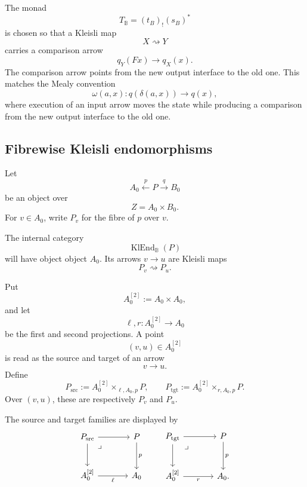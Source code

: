 \begin{remark}
\label{rem:to-direction-output-comparison}
    The monad
    \[
        T_{\mathbb B}=(t_B)_!(s_B)^*
    \]
    is chosen so that a Kleisli map
    \[
        X\rightsquigarrow Y
    \]
    carries a comparison arrow
    \[
        q_Y(Fx)\to q_X(x).
    \]
    The comparison arrow points from the new output interface to the old one.
    This matches the Mealy convention
    \[
        \omega(a,x):q(\delta(a,x))\to q(x),
    \]
    where execution of an input arrow moves the state while producing a
    comparison from the new output interface to the old one.
\end{remark}

\subsection{Fibrewise Kleisli endomorphisms}
\label{subsec:to-fibrewise-kleisli-endomorphisms}

Let
\[
    A_0\xleftarrow{p}P\xrightarrow{q}B_0
\]
be an object over
\[
    Z=A_0\times B_0.
\]
For \(v\in A_0\), write \(P_v\) for the fibre of \(p\) over \(v\).

The internal category
\[
    \operatorname{KlEnd}_{\mathbb B}(P)
\]
will have object object \(A_0\). Its arrows \(v\to u\) are Kleisli maps
\[
    P_v\rightsquigarrow P_u.
\]

Put
\[
    A_0^{[2]}:=A_0\times A_0,
\]
and let
\[
    \ell,r:A_0^{[2]}\to A_0
\]
be the first and second projections. A point
\[
    (v,u)\in A_0^{[2]}
\]
is read as the source and target of an arrow
\[
    v\to u.
\]
Define
\[
    P_{\mathrm{src}}
    :=
    A_0^{[2]}\times_{\ell,A_0,p}P,
    \qquad
    P_{\mathrm{tgt}}
    :=
    A_0^{[2]}\times_{r,A_0,p}P.
\]
Over \((v,u)\), these are respectively \(P_v\) and \(P_u\).

The source and target families are displayed by
\[
\begin{tikzcd}[column sep=large, row sep=large]
    P_{\mathrm{src}}
        \arrow[r]
        \arrow[d]
        \arrow[dr, phantom, "\lrcorner", very near start]
    &
    P
        \arrow[d, "p"]
    \\
    A_0^{[2]}
        \arrow[r, "\ell"']
    &
    A_0
\end{tikzcd}
\qquad
\begin{tikzcd}[column sep=large, row sep=large]
    P_{\mathrm{tgt}}
        \arrow[r]
        \arrow[d]
        \arrow[dr, phantom, "\lrcorner", very near start]
    &
    P
        \arrow[d, "p"]
    \\
    A_0^{[2]}
        \arrow[r, "r"']
    &
    A_0 .
\end{tikzcd}
\]

